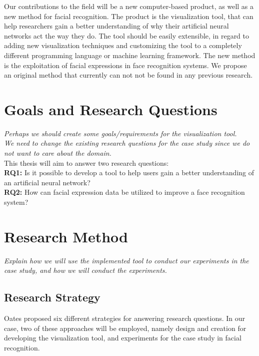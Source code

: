 \noindent Our contributions to the field will be a new computer-based product, as well as a new method for facial recognition. The product is the visualization tool, that can help researchers gain a better understanding of why their artificial neural networks act the way they do. The tool should be easily extensible, in regard to adding new visualization techniques and customizing the tool to a completely different programming language or machine learning framework. The new method is the exploitation of facial expressions in face recognition systems. We propose an original method that currently can not not be found in any previous research.

\section{Goals and Research Questions}

\textit{Perhaps we should create some goals/requirements for the visualization tool. \\
We need to change the existing research questions for the case study since we do not want to care about the domain.}\\

\noindent This thesis will aim to answer two research questions: \\
\noindent\textbf{RQ1:} Is it possible to develop a tool to help users gain a better understanding of an artificial neural network? \\
\noindent\textbf{RQ2:} How can facial expression data be utilized to improve a face recognition system?

\section{Research Method}

\textit{Explain how we will use the implemented tool to conduct our experiments in the case study, and how we will conduct the experiments.}

\subsection{Research Strategy}

\noindent Oates proposed six different strategies for answering research questions. In our case, two of these approaches will be employed, namely design and creation for developing the visualization tool, and experiments for the case study in facial recognition. \\

